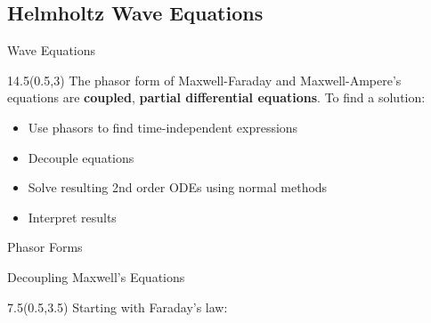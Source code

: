 \begin{lesson34}
\section{Helmholtz Wave Equations}
\begin{frame}{Wave Equations}
\begin{textblock}{14.5}(0.5,3)
The phasor form of Maxwell-Faraday and Maxwell-Ampere's equations are \textbf{coupled}, \textbf{partial differential equations}. To find a solution:
\begin{itemize}
	\item Use phasors to find time-independent expressions
	\item Decouple equations 
	\item Solve resulting 2nd order ODEs using normal methods
	\item Interpret results
\end{itemize}

\begin{myblock}[0.9]{Phasor Forms}
\end{myblock}
\end{textblock}

\end{frame}


\begin{frame}{Decoupling Maxwell's Equations}
\begin{textblock}{7.5}(0.5,3.5)
Starting with Faraday's law:
\begin{small}
\end{small}
\end{textblock}


\end{frame}
\end{lesson34}
